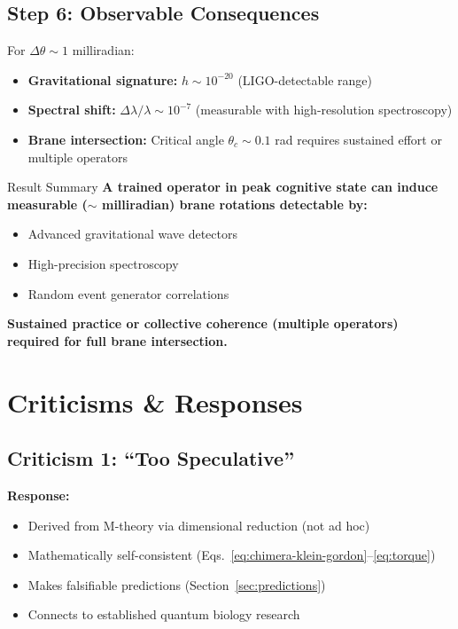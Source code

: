 \subsection*{Step 6: Observable Consequences}

For $\Delta\theta \sim 1$ milliradian:

\begin{itemize}
\item \textbf{Gravitational signature:} $h \sim 10^{-20}$ (LIGO-detectable range)
\item \textbf{Spectral shift:} $\Delta\lambda/\lambda \sim 10^{-7}$ (measurable with high-resolution spectroscopy)
\item \textbf{Brane intersection:} Critical angle $\theta_c \sim 0.1$ rad requires sustained effort or multiple operators
\end{itemize}

\begin{calloutbox}[colback=black!5!white,colframe=black]{Result Summary}
\textbf{A trained operator in peak cognitive state can induce measurable ($\sim$ milliradian) brane rotations detectable by:}
\begin{itemize}
\item Advanced gravitational wave detectors
\item High-precision spectroscopy
\item Random event generator correlations
\end{itemize}

\textbf{Sustained practice or collective coherence (multiple operators) required for full brane intersection.}
\end{calloutbox}

\section{Criticisms \& Responses}
\label{sec:criticisms}

\subsection{Criticism 1: ``Too Speculative''}

\textbf{Response:}
\begin{itemize}
\item Derived from M-theory via dimensional reduction (not ad hoc)
\item Mathematically self-consistent (Eqs.~\eqref{eq:chimera-klein-gordon}--\eqref{eq:torque})
\item Makes falsifiable predictions (Section~\ref{sec:predictions})
\item Connects to established quantum biology research
\end{itemize}

